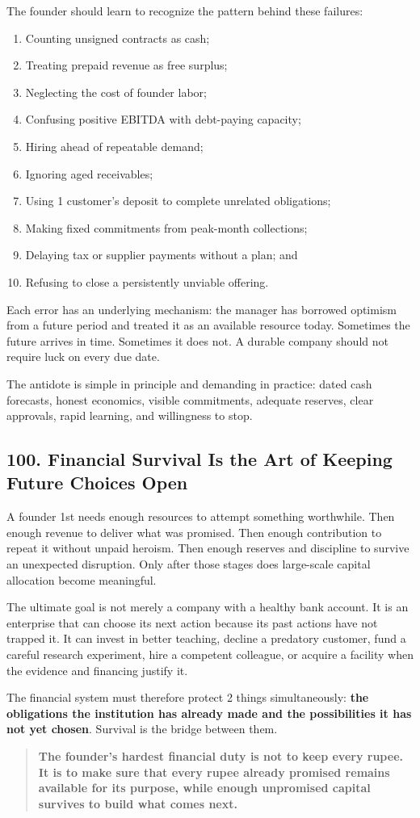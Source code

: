 The founder should learn to recognize the pattern behind these failures:
\begin{enumerate}
\item Counting unsigned contracts as cash;
\item Treating prepaid revenue as free surplus;
\item Neglecting the cost of founder labor;
\item Confusing positive EBITDA with debt-paying capacity;
\item Hiring ahead of repeatable demand;
\item Ignoring aged receivables;
\item Using 1 customer's deposit to complete unrelated obligations;
\item Making fixed commitments from peak-month collections;
\item Delaying tax or supplier payments without a plan; and
\item Refusing to close a persistently unviable offering.
\end{enumerate}

Each error has an underlying mechanism: the manager has borrowed optimism from a future period and treated it as an available resource today. Sometimes the future arrives in time. Sometimes it does not. A durable company should not require luck on every due date.

The antidote is simple in principle and demanding in practice: dated cash forecasts, honest economics, visible commitments, adequate reserves, clear approvals, rapid learning, and willingness to stop.

\subsection*{100. Financial Survival Is the Art of Keeping Future Choices Open}

A founder 1st needs enough resources to attempt something worthwhile. Then enough revenue to deliver what was promised. Then enough contribution to repeat it without unpaid heroism. Then enough reserves and discipline to survive an unexpected disruption. Only after those stages does large-scale capital allocation become meaningful.

The ultimate goal is not merely a company with a healthy bank account. It is an enterprise that can choose its next action because its past actions have not trapped it. It can invest in better teaching, decline a predatory customer, fund a careful research experiment, hire a competent colleague, or acquire a facility when the evidence and financing justify it.

The financial system must therefore protect 2 things simultaneously: \textbf{the obligations the institution has already made and the possibilities it has not yet chosen}. Survival is the bridge between them.

\begin{quote}
\small\textbf{The founder's hardest financial duty is not to keep every rupee. It is to make sure that every rupee already promised remains available for its purpose, while enough unpromised capital survives to build what comes next.}
\end{quote}
